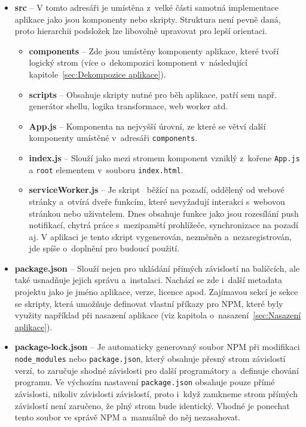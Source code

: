 \begin{itemize}
    \item \textbf{src} -- V tomto adresáři je umístěna z~velké části samotná implementace aplikace jako jsou komponenty nebo skripty. Struktura není pevně daná, proto hierarchii podsložek lze libovolně upravovat pro lepší orientaci.
        \begin{itemize}
            \item \textbf{components} -- Zde jsou umístěny komponenty aplikace, které tvoří logický strom (více o~dekompozici komponent v~následující kapitole~\ref{sec:Dekompozice aplikace}).
            \item \textbf{scripts} -- Obsahuje skripty nutné pro běh aplikace, patří sem např. generátor shellu, logika transformace, web worker atd.
            \item \textbf{App.js} -- Komponenta na nejvyšší úrovní, ze které se větví další komponenty umístěné v~adresáři \texttt{components}.
            \item \textbf{index.js} -- Slouží jako  mezi stromem komponent vzniklý z~kořene \texttt{App.js} a \texttt{root} elementem v~souboru \texttt{index.html}.
            \item \textbf{serviceWorker.js} -- Je skript~\cite{website:ServiceWorkers} běžící na pozadí, oddělený od webové stránky a~otvírá dveře funkcím, které nevyžadují interakci s~webovou stránkou nebo uživatelem. Dnes obsahuje funkce jako jsou rozesílání push notifikací, chytrá práce s~mezipamětí prohlížeče, synchronizace na pozadí aj. V aplikaci je tento skript vygenerován, nezměněn a~nezaregistrován, jde spíše o~doplnění pro budoucí použití.
        \end{itemize}
    \item \textbf{package.json} -- Slouží nejen pro ukládání přímých závislostí na balíčcích, ale také usnadňuje jejich správu a~instalaci. Nachází se zde i~další metadata projektu jako je jméno aplikace, verze, licence apod. Zajímavou sekcí je sekce se skripty, která umožňuje definovat vlastní příkazy pro NPM, které byly využity například při nasazení aplikace (viz kapitola o~nasazení~\ref{sec:Nasazení aplikace}).
    \item \textbf{package-lock.json} -- Je automaticky generovaný soubor NPM při modifikaci \newline\texttt{node\_modules} nebo \texttt{package.json}, který obsahuje přesný strom závislostí verzí, to zaručuje shodné závislosti pro další programátory a~definuje chování programu. Ve výchozím nastavení \texttt{package.json} obsahuje pouze přímé závislosti, nikoliv závislosti závislostí, proto i~když zamkneme strom přímých závislostí není zaručeno, že plný strom bude identický. Vhodné je ponechat tento soubor ve správě NPM a~manuálně do něj nezasahovat.
\end{itemize}

